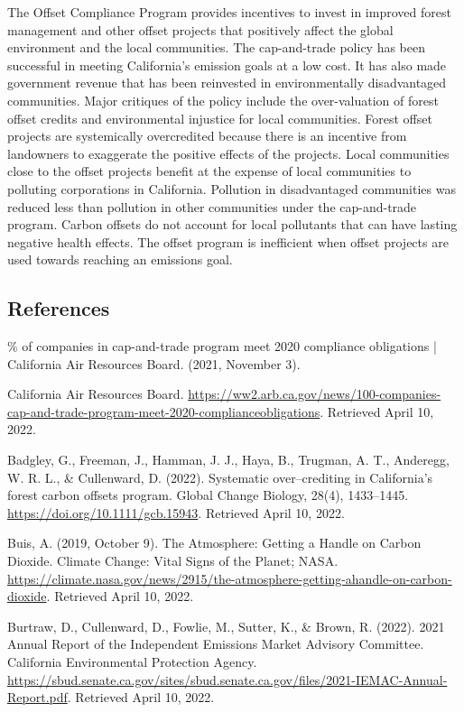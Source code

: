 \documentclass[11pt]{article}
\begin{document}
The Offset Compliance Program provides incentives to invest in improved forest management and other offset projects that positively affect the global environment and the local communities. The cap-and-trade policy has been successful in meeting California's emission goals at a low cost. It has also made government revenue that has been reinvested in environmentally disadvantaged communities. Major critiques of the policy include the over-valuation of forest offset credits and environmental injustice for local communities. Forest offset projects are systemically overcredited because there is an incentive from landowners to exaggerate the positive effects of the projects. Local communities close to the offset projects benefit at the expense of local communities to polluting corporations in California. Pollution in disadvantaged communities was reduced less than pollution in other communities under the cap-and-trade program. Carbon offsets do not account for local pollutants that can have lasting negative health effects. The offset program is inefficient when offset projects are used towards reaching an emissions goal.



\subsection*{References}

\smallskip{}\% of companies in cap-and-trade program meet 2020 compliance obligations | California Air Resources Board. (2021, November 3). 

\smallskip\noindent
California Air Resources Board. \url{https://ww2.arb.ca.gov/news/100-companies-cap-and-trade-program-meet-2020-complianceobligations}. Retrieved April 10, 2022.

\smallskip\noindent
Badgley, G., Freeman, J., Hamman, J. J., Haya, B., Trugman, A. T., Anderegg, W. R. L., \& Cullenward, D. (2022). Systematic over--crediting in California's forest carbon offsets program. Global Change Biology, 28(4), 1433--1445. \url{https://doi.org/10.1111/gcb.15943}. Retrieved April 10, 2022.

\smallskip\noindent
Buis, A. (2019, October 9). The Atmosphere: Getting a Handle on Carbon Dioxide. Climate Change: Vital Signs of the Planet; NASA. \url{https://climate.nasa.gov/news/2915/the-atmosphere-getting-ahandle-on-carbon-dioxide}. Retrieved April 10, 2022.

\smallskip\noindent
Burtraw, D., Cullenward, D., Fowlie, M., Sutter, K., \& Brown, R. (2022). 2021 Annual Report of the Independent Emissions Market Advisory Committee. California Environmental Protection Agency. \url{https://sbud.senate.ca.gov/sites/sbud.senate.ca.gov/files/2021-IEMAC-Annual-Report.pdf}. Retrieved April 10, 2022.
\end{document}
